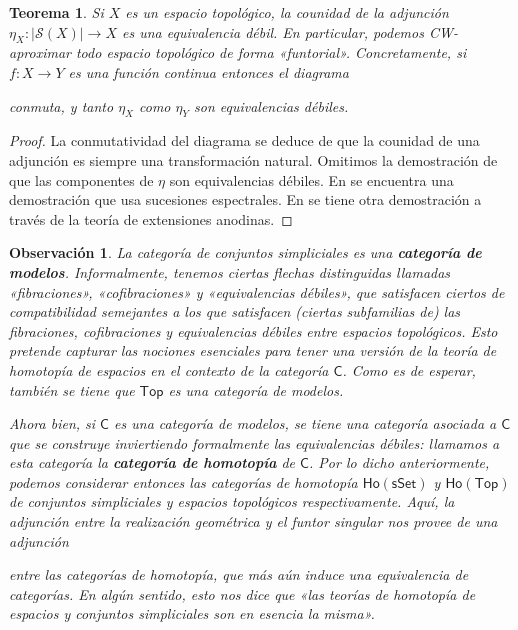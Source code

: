 \documentclass[11pt]{report}
\theoremstyle{colored}
\newtheorem{theorem}{Teorema}[section]
\newtheorem{remark}{Observación}[section]
\newcommand{\cat}[1]{\mathsf{#1}}
\newcommand{\guill}[1]{«#1»}
\begin{document}
\begin{theorem} Si $X$ es un espacio topológico, la counidad de la adjunción $\eta_X : |\mathcal{S}(X)|\to X$ es una equivalencia débil. En particular, podemos CW-aproximar todo espacio topológico de forma \guill{funtorial}. Concretamente, si $f : X \to Y$ es una función continua entonces el diagrama
\begin{center}
\end{center}
conmuta, y tanto $\eta_X$ como $\eta_Y$ son equivalencias débiles. 
\end{theorem}
\begin{proof} La conmutatividad del diagrama se deduce de que la counidad de una adjunción es siempre una transformación natural. Omitimos la demostración de que las componentes de $\eta$ son equivalencias débiles. En \cite{M} se encuentra una demostración que usa sucesiones espectrales. En \cite{GJ} se tiene otra demostración a través de la teoría de extensiones anodinas. 
\end{proof}

\begin{remark} La categoría de conjuntos simpliciales es una \textbf{categoría de modelos}. Informalmente, tenemos ciertas flechas distinguidas llamadas \guill{fibraciones}, \guill{cofibraciones} y \guill{equivalencias débiles}, que satisfacen ciertos de compatibilidad semejantes a los que satisfacen (ciertas subfamilias de) las fibraciones, cofibraciones y equivalencias débiles entre espacios topológicos. Esto pretende capturar las nociones esenciales para tener una versión de la teoría de homotopía de espacios en el contexto de la categoría $\cat{C}$. Como es de esperar, también se tiene que $\cat{Top}$ es una categoría de modelos.

Ahora bien, si $\cat{C}$ es una categoría de modelos, se tiene una categoría asociada a $\cat{C}$ que se construye inviertiendo formalmente las equivalencias débiles: llamamos a esta categoría la \textbf{categoría de homotopía} de $\cat{C}$. Por lo dicho anteriormente, podemos considerar entonces las categorías de homotopía $\cat{Ho(sSet)}$ y $\cat{Ho(Top)}$ de conjuntos simpliciales y espacios topológicos respectivamente. Aquí, la adjunción entre la realización geométrica y el funtor singular nos provee de una adjunción
\begin{center}
\end{center}
entre las categorías de homotopía, que más aún induce una equivalencia de categorías. En algún sentido, esto nos dice que \guill{las teorías de homotopía de espacios y conjuntos simpliciales son en esencia la misma}. 

\end{remark}
\end{document}
